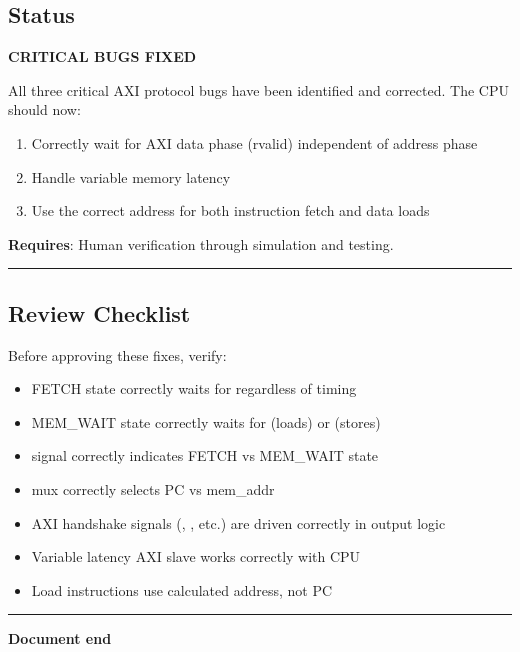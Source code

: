 \subsection{Status}\label{cr:fix:critical-fixes:status}

\begin{record}

\textbf{\ok{} CRITICAL BUGS FIXED}

All three critical AXI protocol bugs have been identified and corrected.
The CPU should now:

\begin{enumerate}
\def\labelenumi{\arabic{enumi}.}
\tightlist
\item
  Correctly wait for AXI data phase (rvalid) independent of address
  phase
\item
  Handle variable memory latency
\item
  Use the correct address for both instruction fetch and data loads
\end{enumerate}

\textbf{Requires}: Human verification through simulation and testing.

\begin{center}\rule{0.5\linewidth}{0.5pt}\end{center}

\end{record}

\subsection{Review Checklist}\label{cr:fix:critical-fixes:review-checklist}

\begin{record}

Before approving these fixes, verify:

\begin{itemize}
\tightlist
\item[$\square$]
  FETCH state correctly waits for  regardless of
   timing
\item[$\square$]
  MEM\_WAIT state correctly waits for  (loads) or
   (stores)
\item[$\square$]
   signal correctly indicates FETCH vs MEM\_WAIT state
\item[$\square$]
   mux correctly selects PC vs mem\_addr
\item[$\square$]
  AXI handshake signals (, , etc.) are driven
  correctly in output logic
\item[$\square$]
  Variable latency AXI slave works correctly with CPU
\item[$\square$]
  Load instructions use calculated address, not PC
\end{itemize}

\begin{center}\rule{0.5\linewidth}{0.5pt}\end{center}

\textbf{Document end}

\end{record}

